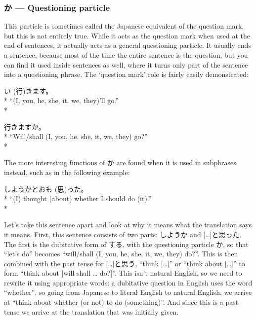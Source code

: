 \documentclass[11pt, b5paper, twoside, openright, onecolumn]{book}
\makeatletter
\newcommand*{\rubystack}[2]{{\relscale{0.5}%
  \begin{tabular}[b]{@{}c@{}}%
    {#1}\\%
   {\textscale{2}{#2}}%
  \end{tabular}}%
}
\DeclareRobustCommand*{\ruby}[2]{%
  \mbox{%
    \setlength{\parskip}{0ex}%
    \BeginAccSupp{method=pdfstringdef,ActualText={#1}}%
      \rubystack{\phantom{#2}}{#1}%
      \llap{%
        \rubystack{#2}{\phantom{#1}}%
      }%
    \EndAccSupp{}%
  }%
}
\renewcommand*{\ruby}[2]{#2 (#1)}%
\newenvironment{exampleblock}{
\setlength{\parindent}{0.6in}
\begin{minipage}[t]{\dimexpr\textwidth-\parindent}}
{\end{minipage}}
\makeatother
\begin{document}
\subsubsection{か — Questioning particle}

This particle is sometimes called the Japanese equivalent of the question mark‚ but this is not entirely true. While it acts as the question mark when used at the end of sentences‚ it actually acts as a general questioning particle. It usually ends a sentence‚ because most of the time the entire sentence is the question‚ but you can find it used inside sentences as well‚ where it turns only part of the sentence into a questioning phrase. The ‘question mark’ role is fairly easily demonstrated:

\vspace{0.4cm}
\begin{exampleblock}
\ruby{行}{い}きます。 \\* 
“(I‚ you‚ he‚ she‚ it‚ we‚ they)’ll go.” \\* 
\end{exampleblock}
\vspace{0.2cm}

\begin{exampleblock}
行きますか。 \\* 
“Will/shall (I‚ you‚ he‚ she‚ it‚ we‚ they) go?” \\* 
\end{exampleblock}
\vspace{0.2cm}

The more interesting functions of か are found when it is used in subphrases instead‚ such as in the following example:

\vspace{0.4cm}
\begin{exampleblock}
しようかと\ruby{思}{おも}った。 \\* 
“(I) thought (about) whether I should do (it).” \\* 
\end{exampleblock}
\vspace{0.2cm}

Let’s take this sentence apart and look at why it means what the translation says it means. First‚ this sentence consists of two parts: しようか and […]と思った. The first is the dubitative form of する‚ with the questioning particle か‚ so that “let’s do” becomes “will/shall (I‚ you‚ he‚ she‚ it‚ we‚ they) do?”. This is then combined with the past tense for […]と思う‚ “think […]” or “think about […]” to form “think about [will shall … do?]”. This isn’t natural English‚ so we need to rewrite it using appropriate words: a dubitative question in English uses the word “whether”‚ so going from Japanese to literal English to natural English‚ we arrive at “think about whether (or not) to do (something)”. And since this is a past tense we arrive at the translation that was initially given.
\end{document}
